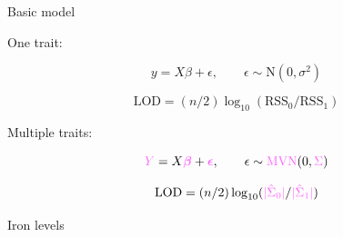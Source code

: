 \documentclass[12pt]{article}
\newcommand{\headsize}{\fontsize{35}{35} \selectfont}
\newcommand{\smallsize}{\fontsize{25}{30} \selectfont}
\begin{document}
\newpage

\headsize \color{myyellow}
\hfill \begin{minipage}{5.75in}
\centering
Basic model
\end{minipage}

\vspace{25mm}

\color{white} \smallsize

One trait:

\vspace{-18pt}

{\color{myblue} $$ y = X \beta + \epsilon, \qquad \epsilon \sim \text{N}(0, \sigma^2) $$}

\vspace{-8pt}

{\color{myblue} $$ \text{LOD} = (n/2) \log_{10} ( \text{RSS}_0 /
  \text{RSS}_1 ) $$ }

\vspace{15mm}

Multiple traits:

\vspace{-18pt}

{\color{myblue} $$ {\color{mypink} Y} = X {\color{mypink}
    \boldsymbol{\beta}} + {\color{mypink} \boldsymbol{\epsilon}},
  \qquad \epsilon \sim \text{\color{mypink} MVN}(0, {\color{mypink} \Sigma}) $$ }

\vspace{-8pt}

{\color{myblue} $$ \text{LOD} = (n/2) \log_{10} ( {\color{mypink} |\hat{\Sigma}_0|} /
  {\color{mypink} |\hat{\Sigma}_1|}) $$ }



\newpage

\headsize \color{myyellow}
\hfill \begin{minipage}{5.75in}
\centering
Iron levels
\end{minipage}

\vspace{15mm}
\end{document}
